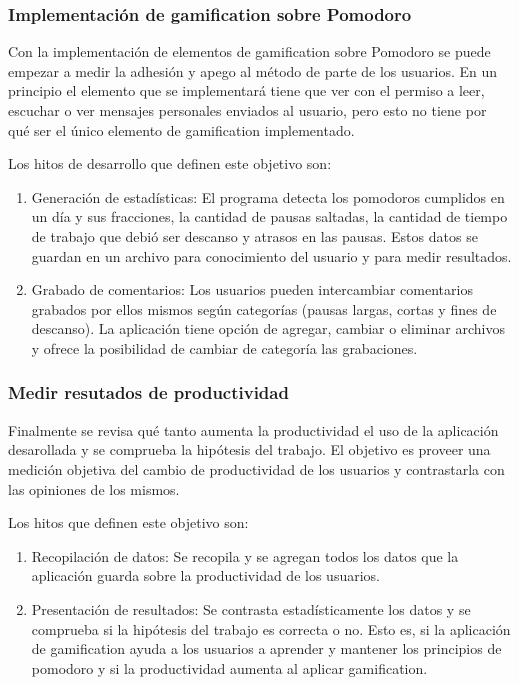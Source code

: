 \documentclass[12pt,letterpaper]{report}
\providecommand{\tightlist}{%
  \setlength{\itemsep}{0pt}\setlength{\parskip}{0pt}}
\begin{document}
\subsubsection{Implementación de gamification sobre Pomodoro}\label{implementacion-de-gamification-sobre-pomodoro}

Con la implementación de elementos de gamification sobre Pomodoro se puede empezar a medir la adhesión y apego al método
de parte de los usuarios. En un principio el elemento que se implementará tiene que ver con el permiso a leer, escuchar
o ver mensajes personales enviados al usuario, pero esto no tiene por qué ser el único elemento de gamification
implementado.

Los hitos de desarrollo que definen este objetivo son:

\begin{enumerate}\tightlist{}
  \item Generación de estadísticas: El programa detecta los pomodoros cumplidos en un día y sus fracciones, la cantidad
    de pausas saltadas, la cantidad de tiempo de trabajo que debió ser descanso y atrasos en las pausas. Estos datos se
    guardan en un archivo para conocimiento del usuario y para medir resultados.
  \item Grabado de comentarios: Los usuarios pueden intercambiar comentarios grabados por ellos mismos según categorías
    (pausas largas, cortas y fines de descanso). La aplicación tiene opción de agregar, cambiar o eliminar archivos y
    ofrece la posibilidad de cambiar de categoría las grabaciones.
\end{enumerate}

\subsubsection{Medir resutados de productividad}\label{medir-resultados-de-productividad}

Finalmente se revisa qué tanto aumenta la productividad el uso de la aplicación desarollada y se comprueba la hipótesis
del trabajo. El objetivo es proveer una medición objetiva del cambio de productividad de los usuarios y contrastarla con
las opiniones de los mismos.

Los hitos que definen este objetivo son:

\begin{enumerate}\tightlist{}
  \item Recopilación de datos: Se recopila y se agregan todos los datos que la aplicación guarda sobre la productividad
    de los usuarios.
  \item Presentación de resultados: Se contrasta estadísticamente los datos y se comprueba si la hipótesis del trabajo
    es correcta o no. Esto es, si la aplicación de gamification ayuda a los usuarios a aprender y mantener los
    principios de pomodoro y si la productividad aumenta al aplicar gamification.
\end{enumerate}
\end{document}
